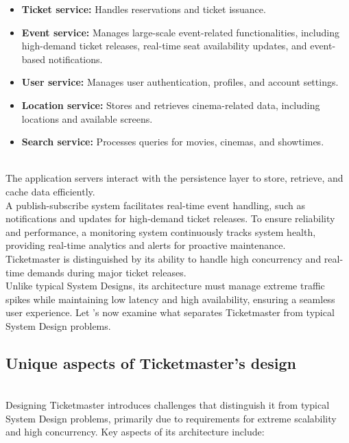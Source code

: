 \begin{itemize}
\item
\protect{}\label{VWPkOR50Mz9t_qtueO0AD}
\textbf{Ticket service:} Handles reservations and ticket issuance.
\item
\protect{}\label{WBxamlqZ8D9ecz9YIfI2A}
\textbf{Event service:} Manages large-scale event-related functionalities, including high-demand ticket releases, real-time seat availability updates, and event-based notifications.
\item
\protect{}\label{ih4-tRYaqyqEqCNq_XgTj}
\textbf{User service:} Manages user authentication, profiles, and account settings.
\item
\protect{}\label{VTZB4HVLNn_KBrMUKapzU}
\textbf{Location service:} Stores and retrieves cinema-related data, including locations and available screens.
\item
\protect{}\label{hDMQH74D3GPKvB9cuxWVm}
\textbf{Search service:} Processes queries for movies, cinemas, and showtimes.
\end{itemize}
\\
The application servers interact with the persistence layer to store, retrieve, and cache data efficiently.
\\
A publish-subscribe system facilitates real-time event handling, such as notifications and updates for high-demand ticket releases. To ensure reliability and performance, a monitoring system continuously tracks system health, providing real-time analytics and alerts for proactive maintenance.
\\
Ticketmaster is distinguished by its ability to handle high concurrency and real-time demands during major ticket releases.
\\
Unlike typical System Designs, its architecture must manage extreme traffic spikes while maintaining low latency and high availability, ensuring a seamless user experience. Let 's now examine what separates Ticketmaster from typical System Design problems.

\subsection{Unique aspects of Ticketmaster's design}\label{bT6WsZjI7yujzLIbVu2ev}
\\
Designing Ticketmaster introduces challenges that distinguish it from typical System Design problems, primarily due to requirements for extreme scalability and high concurrency. Key aspects of its architecture include:

